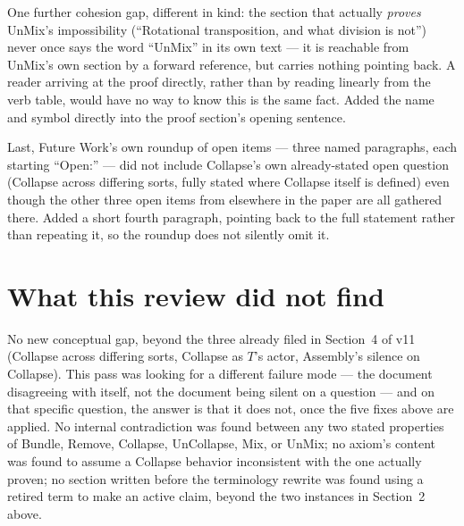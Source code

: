 \documentclass[11pt]{article}
\begin{document}
One further cohesion gap, different in kind: the section that
actually \emph{proves} UnMix's impossibility (``Rotational
transposition, and what division is not'') never once says the word
``UnMix'' in its own text --- it is reachable from UnMix's own
section by a forward reference, but carries nothing pointing back. A
reader arriving at the proof directly, rather than by reading
linearly from the verb table, would have no way to know this is the
same fact. Added the name and symbol directly into the proof
section's opening sentence.

Last, Future Work's own roundup of open items --- three named
paragraphs, each starting ``Open:'' --- did not include Collapse's
own already-stated open question (Collapse across differing sorts,
fully stated where Collapse itself is defined) even though the other
three open items from elsewhere in the paper are all gathered there.
Added a short fourth paragraph, pointing back to the full statement
rather than repeating it, so the roundup does not silently omit it.

\section{What this review did not find}

No new conceptual gap, beyond the three already filed in
Section~4 of v11 (Collapse across differing sorts, Collapse as $T$'s
actor, Assembly's silence on Collapse). This pass was looking for a
different failure mode --- the document disagreeing with itself,
not the document being silent on a question --- and on that
specific question, the answer is that it does not, once the five
fixes above are applied. No internal contradiction was found between
any two stated properties of Bundle, Remove, Collapse, UnCollapse,
Mix, or UnMix; no axiom's content was found to assume a Collapse
behavior inconsistent with the one actually proven; no section
written before the terminology rewrite was found using a retired
term to make an active claim, beyond the two instances in
Section~2 above.
\end{document}
